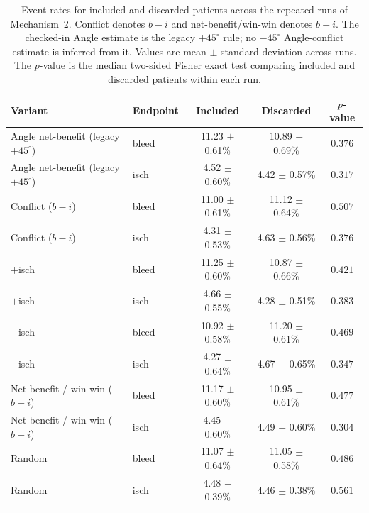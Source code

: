 \begin{table}[htbp]
\centering
\small
\setlength{\tabcolsep}{6pt}
\begin{tabular}{llccc}
\toprule
Variant & Endpoint & Included & Discarded & $p$-value \\
\midrule
Angle net-benefit (legacy $+45^\circ$) & bleed & 11.23 $\pm$ 0.61\% & 10.89 $\pm$ 0.69\% & $0.376$ \\
Angle net-benefit (legacy $+45^\circ$) & isch & 4.52 $\pm$ 0.60\% & 4.42 $\pm$ 0.57\% & $0.317$ \\
Conflict ($b-i$) & bleed & 11.00 $\pm$ 0.61\% & 11.12 $\pm$ 0.64\% & $0.507$ \\
Conflict ($b-i$) & isch & 4.31 $\pm$ 0.53\% & 4.63 $\pm$ 0.56\% & $0.376$ \\
$+$isch & bleed & 11.25 $\pm$ 0.60\% & 10.87 $\pm$ 0.66\% & $0.421$ \\
$+$isch & isch & 4.66 $\pm$ 0.55\% & 4.28 $\pm$ 0.51\% & $0.383$ \\
$-$isch & bleed & 10.92 $\pm$ 0.58\% & 11.20 $\pm$ 0.61\% & $0.469$ \\
$-$isch & isch & 4.27 $\pm$ 0.64\% & 4.67 $\pm$ 0.65\% & $0.347$ \\
Net-benefit / win-win ($b+i$) & bleed & 11.17 $\pm$ 0.60\% & 10.95 $\pm$ 0.61\% & $0.477$ \\
Net-benefit / win-win ($b+i$) & isch & 4.45 $\pm$ 0.60\% & 4.49 $\pm$ 0.60\% & $0.304$ \\
Random & bleed & 11.07 $\pm$ 0.64\% & 11.05 $\pm$ 0.58\% & $0.486$ \\
Random & isch & 4.48 $\pm$ 0.39\% & 4.46 $\pm$ 0.38\% & $0.561$ \\
\bottomrule
\end{tabular}
\caption{Event rates for included and discarded patients across the repeated runs of Mechanism~2. Conflict denotes $b-i$ and net-benefit/win-win denotes $b+i$. The checked-in Angle estimate is the legacy $+45^\circ$ rule; no $-45^\circ$ Angle-conflict estimate is inferred from it. Values are mean $\pm$ standard deviation across runs. The $p$-value is the median two-sided Fisher exact test comparing included and discarded patients within each run.}
\label{tab:mechanism2_event_rates}
\end{table}
